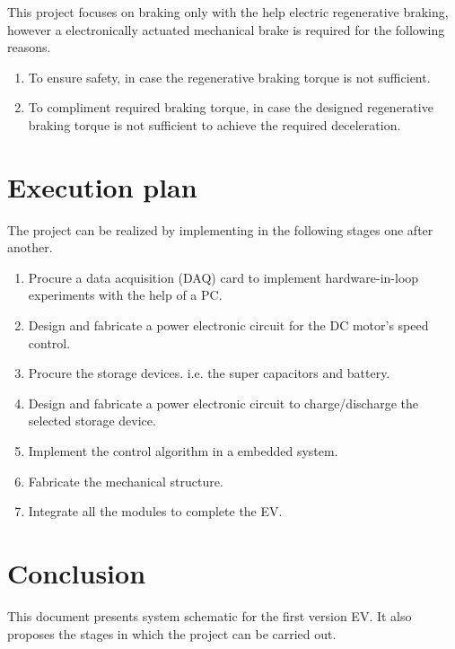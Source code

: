\documentclass[journal]{IEEEtran}
\begin{document}
This project focuses on braking only with the help electric regenerative braking, however a electronically actuated mechanical brake is required for the following reasons.
\begin{enumerate}
  \item To ensure safety, in case the regenerative braking torque is not sufficient.
  \item To compliment required braking torque, in case the designed regenerative braking torque is not sufficient to achieve the required deceleration.
\end{enumerate}


\section{Execution plan}
The project can be realized by implementing in the following stages one after another.
\begin{tcolorbox}[colback=blue!0!white,colframe=blue!75!black,title=Project stages]
\begin{enumerate}
  \item Procure a data acquisition (DAQ) card to implement hardware-in-loop experiments with the help of a PC.
  \item Design and fabricate a power electronic circuit for the DC motor's speed control.
  \item Procure the storage devices. i.e. the super capacitors and battery.
  \item Design and fabricate a power electronic circuit to charge/discharge the selected storage device.
  \item Implement the control algorithm in a embedded system.
  \item Fabricate the mechanical structure.
  \item Integrate all the modules to complete the EV.
\end{enumerate}
\end{tcolorbox}
\section{Conclusion}
This document presents system schematic for the first version EV. It also proposes the stages in which the project can be carried out.


\end{document}
